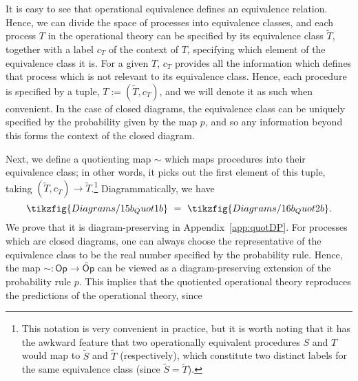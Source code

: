 \documentclass[onecolum,aps,groupedaddress,nofootinbib]{revtex4-2}
\newcommand\Op{\mathsf{Op}}
\begin{document}
It is easy to see that operational equivalence defines an equivalence relation. Hence, we can divide the space of processes into equivalence classes, and each process $T$ in the operational theory can be specified by its equivalence class $\widetilde{T}$, together with a label $c_T$ of the context of $T$, specifying which element of the equivalence class it is. For a given $T$, $c_T$ provides all the information which defines that process which is not relevant to its equivalence class. Hence, each procedure is specified by a tuple, $T :=(\widetilde{T},c_T)$, and we will denote it as such when convenient. In the case of closed diagrams, the equivalence class can be uniquely specified by the probability given by the map $p$, and so any information beyond this forms the context of the closed diagram.

Next, we define a quotienting map $\sim$ which maps procedures into their equivalence class; in other words, it picks out the first element of this tuple, taking $(\widetilde{T},c_T) \to \widetilde{T}$.\footnote{ This notation is very convenient in practice, but it is worth noting that it has the awkward feature that two operationally equivalent procedures $S$ and $T$ would map to $\widetilde{S}$ and $\widetilde{T}$ (respectively), which constitute two distinct labels for the same equivalence class (since $\widetilde{S}=\widetilde{T}$).  } Diagrammatically, we have
\[\tikzfig{Diagrams/15b_Quot1b}\ =\ \tikzfig{Diagrams/16b_Quot2b}.\]
We prove that it is diagram-preserving in Appendix~\ref{app:quotDP}. 
For processes which are closed diagrams, one can always choose the representative of the equivalence class to be the real number specified by the probability rule. 
Hence, the map \colorbox{black!50!blue!30!}{$\sim:\Op\to\widetilde{\Op}$} can be viewed as a diagram-preserving extension of the probability rule $p$. 
This implies that the quotiented operational theory reproduces the predictions of the operational theory, since
\beq\label{eq:GPTProbs}
\end{document}
